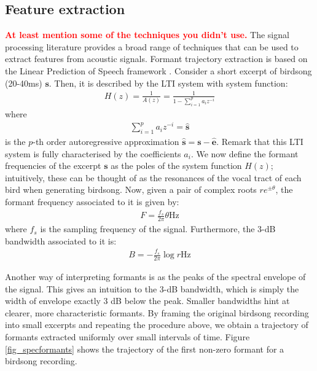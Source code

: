 \documentclass[pdftex,11pt,a4paper]{article}
\theoremstyle{definition}
\theoremstyle{remark}
\newcommand*{\V}[1]{\mathbf{#1}}%
\begin{document}
\subsection{Feature extraction}
\par \textcolor{red}{\textbf{At least mention some of the techniques you didn't use.}} 
The signal processing literature provides a broad range of techniques that can be used to extract features from acoustic signals. 
Formant trajectory extraction is based on the Linear Prediction of Speech framework \cite{Snell1993}. Consider a short excerpt of birdsong (20-40ms) $\V{s}$. Then, it is described by the LTI system with system function:
\begin{align*}
H(z) = \frac{1}{A(z)} = \frac{1}{1-\sum_{i=1}^pa_iz^{-i}}
\end{align*}
where 
\begin{align*}
\sum_{i=1}^pa_iz^{-i} = \V{\hat{s}}
\end{align*}
is the $p$-th order autoregressive approximation $\V{\hat{s}} = \V{s} - \V{\hat{e}}$. Remark that this LTI system is fully characterised by the coefficients $a_i$. We now define the formant frequencies of the excerpt $\V{s}$ as the poles of the system function $H(z)$; intuitively, these can be thought of as the resonances of the vocal tract of each bird when generating birdsong. Now, given a pair of complex roots $re^{\pm\theta}$, the formant frequency associated to it is given by:
\begin{align*}
F = \frac{f_s}{2\pi}\theta \text{Hz}
\end{align*}
where $f_s$ is the sampling frequency of the signal. Furthermore, the 3-dB bandwidth associated to it is:
\begin{align*}
B = -\frac{f_s}{2\pi}\log{r} \text{Hz}
\end{align*}
\par Another way of interpreting formants is as the peaks of the spectral envelope of the signal. This gives an intuition to the 3-dB bandwidth, which is simply the width of envelope exactly 3 dB below the peak. Smaller bandwidths hint at clearer, more characteristic formants. By framing the original birdsong recording into small excerpts and repeating the procedure above, we obtain a trajectory of formants extracted uniformly over small intervals of time. Figure \ref{fig_specformants} shows the trajectory of the first non-zero formant for a birdsong recording.
\end{document}
